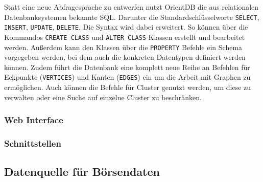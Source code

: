 
Statt eine neue Abfragesprache zu entwerfen nutzt OrientDB die aus relationalen Datenbanksystemen bekannte \gls{SQL}. Darunter die Standardschlüsselworte \texttt{SELECT}, \texttt{INSERT}, \texttt{UPDATE}, \texttt{DELETE}. Die Syntax wird dabei erweitert. So können über die Kommandos \texttt{CREATE CLASS} und \texttt{ALTER CLASS} Klassen erstellt und bearbeitet werden. Außerdem kann den Klassen über die \texttt{PROPERTY} Befehle ein Schema vorgegeben werden, bei dem auch die konkreten Datentypen definiert werden können. Zudem führt die Datenbank eine komplett neue Reihe an Befehlen für Eckpunkte (\texttt{VERTICES}) und Kanten (\texttt{EDGES}) ein um die Arbeit mit Graphen zu ermöglichen. Auch können die Befehle für Cluster genutzt werden, um diese zu verwalten oder eine Suche auf einzelne Cluster zu beschränken.


\subsubsection{Web Interface}

\subsubsection{Schnittstellen}
% 

\subsection{Datenquelle für Börsendaten}




